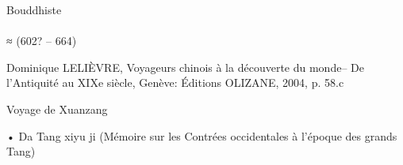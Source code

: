 \begin{Def}[Fo]
    Bouddhiste
\end{Def}

\paragraph{}
≈    (602? – 664)
 














Dominique LELIÈVRE, Voyageurs chinois à la découverte du monde– De l’Antiquité au XIXe siècle, Genève: Éditions OLIZANE, 2004, p. 58.c
 



Voyage de Xuanzang

•	Da Tang xiyu ji (Mémoire sur les Contrées occidentales à l’époque des grands Tang)
